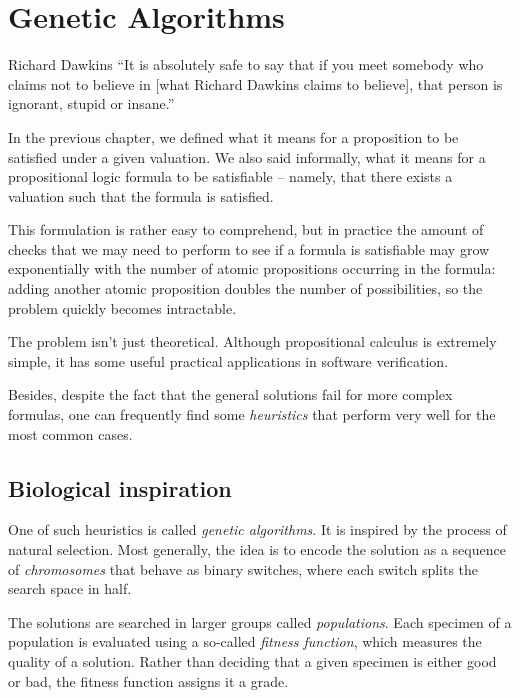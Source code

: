 \chapter{Genetic Algorithms}

\begin{chapquote}{Richard Dawkins}
``It is absolutely safe to say that if you meet somebody who claims
not to believe in [what Richard Dawkins claims to believe], that
person is ignorant, stupid or insane.''
\end{chapquote}

In the previous chapter, we defined what it means for a
proposition to be satisfied under a given valuation.
We also said informally, what it means for a propositional
logic formula to be satisfiable -- namely, that there exists
a valuation such that the formula is satisfied.

This formulation is rather easy to comprehend, but in practice
the amount of checks that we may need to perform to see if
a formula is satisfiable may grow exponentially with the number
of atomic propositions occurring in the formula: adding another
atomic proposition doubles the number of possibilities, so the
problem quickly becomes intractable.

The problem isn't just theoretical. Although propositional
calculus is extremely simple, it has some useful practical
applications in software verification.

Besides, despite the fact that the general solutions fail
for more complex formulas, one can frequently find some
\textit{heuristics} that perform very well for the most
common cases.

\section{Biological inspiration}

One of such heuristics is called \textit{genetic algorithms}.
It is inspired by the process of natural selection. Most
generally, the idea is to encode the solution as a sequence
of \textit{chromosomes} that behave as binary switches, where
each switch splits the search space in half.

The solutions are searched in larger groups called
\textit{populations}. Each specimen of a population
is evaluated using a so-called \textit{fitness function},
which measures the quality of a solution. Rather than
deciding that a given specimen is either good or bad,
the fitness function assigns it a grade.

